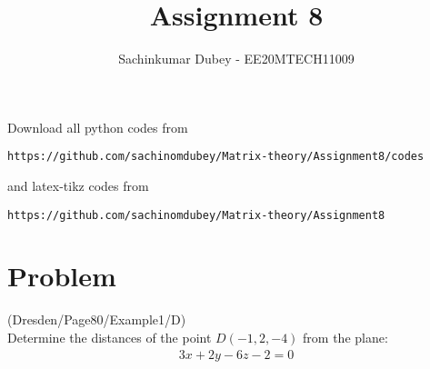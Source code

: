 \documentclass[journal,12pt,twocolumn]{IEEEtran}
\begin{document}
\def\putbox#1#2#3{\makebox[0in][l]{\makebox[#1][l]{}\raisebox{\baselineskip}[0in][0in]{\raisebox{#2}[0in][0in]{#3}}}}
     \def\rightbox#1{\makebox[0in][r]{#1}}
     \def\centbox#1{\makebox[0in]{#1}}
     \def\topbox#1{\raisebox{-\baselineskip}[0in][0in]{#1}}
     \def\midbox#1{\raisebox{-0.5\baselineskip}[0in][0in]{#1}}
\vspace{3cm}
\title{Assignment 8}
\author{Sachinkumar Dubey - EE20MTECH11009}
\maketitle
\newpage
\bigskip
\renewcommand{\thefigure}{\theenumi}
\renewcommand{\thetable}{\theenumi}
Download all python codes from 
\begin{lstlisting}
https://github.com/sachinomdubey/Matrix-theory/Assignment8/codes
\end{lstlisting}
%
and latex-tikz codes from 
%
\begin{lstlisting}
https://github.com/sachinomdubey/Matrix-theory/Assignment8
\end{lstlisting}
\section{Problem}
(Dresden/Page80/Example1/D)\\Determine the distances of the point $D(-1, 2, -4)$ from the plane:
\begin{align}
3x+2y-6z-2=0\label{eq:1.0.1}
\end{align}
\end{document}
